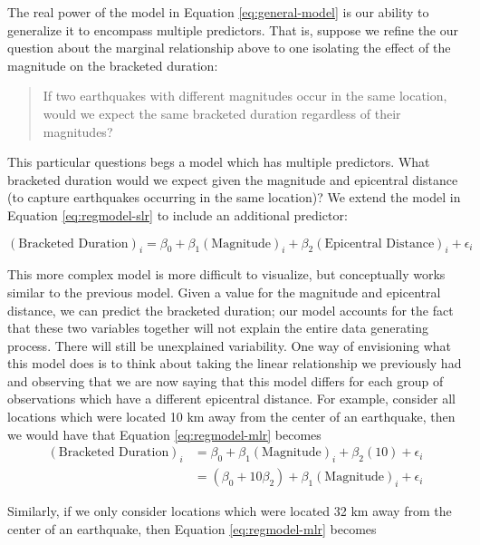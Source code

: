 \documentclass[]{book}
\theoremstyle{definition}
\theoremstyle{definition}
\theoremstyle{definition}
\theoremstyle{remark}
\begin{document}
The real power of the model in Equation \eqref{eq:general-model} is our
ability to generalize it to encompass multiple predictors. That is,
suppose we refine the our question about the marginal relationship above
to one isolating the effect of the magnitude on the bracketed duration:

\begin{quote}
If two earthquakes with different magnitudes occur in the same location,
would we expect the same bracketed duration regardless of their
magnitudes?
\end{quote}

This particular questions begs a model which has multiple predictors.
What bracketed duration would we expect given the magnitude and
epicentral distance (to capture earthquakes occurring in the same
location)? We extend the model in Equation \eqref{eq:regmodel-slr} to
include an additional predictor:

\begin{equation}
  (\text{Bracketed Duration})_i = \beta_0 + \beta_1(\text{Magnitude})_i + \beta_2(\text{Epicentral Distance})_i + \epsilon_i
  \label{eq:regmodel-mlr}
\end{equation}

This more complex model is more difficult to visualize, but conceptually
works similar to the previous model. Given a value for the magnitude and
epicentral distance, we can predict the bracketed duration; our model
accounts for the fact that these two variables together will not explain
the entire data generating process. There will still be unexplained
variability. One way of envisioning what this model does is to think
about taking the linear relationship we previously had and observing
that we are now saying that this model differs for each group of
observations which have a different epicentral distance. For example,
consider all locations which were located 10 km away from the center of
an earthquake, then we would have that Equation \eqref{eq:regmodel-mlr}
becomes \[
\begin{aligned}
(\text{Bracketed Duration})_i &= \beta_0 + \beta_1(\text{Magnitude})_i + \beta_2(10) + \epsilon_i \\
  &= \left(\beta_0 + 10\beta_2\right) + \beta_1(\text{Magnitude})_i + \epsilon_i
\end{aligned}
\]

Similarly, if we only consider locations which were located 32 km away
from the center of an earthquake, then Equation \eqref{eq:regmodel-mlr}
becomes
\end{document}
